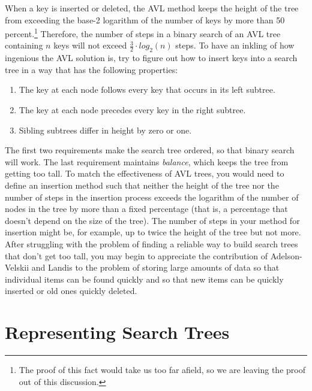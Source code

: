 When a key is inserted or deleted,
the AVL method keeps the height of the tree from exceeding
the base-2 logarithm of the number of keys by more than
\label{50pct-thm}
50 percent.\footnote{The proof
of this fact would take us too far afield, so we are
leaving the proof out of this discussion.}
Therefore, the number of steps in a binary search
of an AVL tree containing $n$ keys
will  not exceed $\frac{3}{2}\cdot log_2(n)$ steps.
To have an inkling of how ingenious the AVL solution is,
try to figure out how to insert keys into a search tree
in a way that has the following properties:
\begin{enumerate}
\item The key at each node follows every key that occurs in its left subtree.
\item The key at each node precedes every key in the right subtree.
\item Sibling subtrees differ in height by zero or one.
\end{enumerate}

The first two requirements make the search tree ordered,
so that binary search will work.
The last requirement maintains
\label{balance-def}
\emph{balance},
which keeps the tree from getting too tall.
To match the effectiveness of AVL trees,
you would need to define an insertion method
such that neither the height of the tree nor
the number of steps in the insertion
process exceeds the logarithm of the
number of nodes in the tree by more
than a fixed percentage (that is, a percentage that
doesn't depend on the size of the tree).
The number of steps in your method for insertion
might be, for example, up to twice the height of the tree
but not more.
After struggling with the problem of
finding a reliable way to build search trees
that don't get too tall,
you may begin to appreciate the contribution
of Adelson-Velskii and Landis to the problem
of storing large amounts of data so that
individual items can be found quickly
and so that new items can be quickly inserted or
old ones quickly deleted.

\section{Representing Search Trees}

